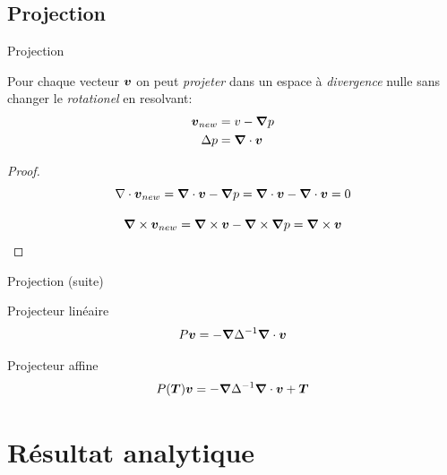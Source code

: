 \subsection{Projection}
\begin{frame}{Projection}
 
 \begin{property}
 Pour chaque vecteur ${\boldsymbol {v}}$ on peut \emph{projeter} dans un espace à \emph{divergence} nulle sans changer le \emph{rotationel} en resolvant:
  \begin{align*}
  {\boldsymbol {v}}_{new}&=v-{\boldsymbol {\nabla}} p\\
  \Delta p&={\boldsymbol {\nabla}} \cdot {\boldsymbol {v}}
  \end{align*}
  \begin{proof}
   \begin{equation*}
   \nabla\cdot {\boldsymbol {v}}_{new}={\boldsymbol {\nabla}} \cdot {\boldsymbol {v}}-{\boldsymbol {\nabla}} p={\boldsymbol {\nabla}} \cdot {\boldsymbol {v}}-{\boldsymbol {\nabla}} \cdot {\boldsymbol {v}}=0
   \end{equation*}
   
   \begin{equation*}
    {\boldsymbol {\nabla}} \times {\boldsymbol {v}}_{new}={\boldsymbol {\nabla}} \times {\boldsymbol {v}}-{\boldsymbol {\nabla}}\times {\boldsymbol {\nabla}}p={\boldsymbol {\nabla}} \times {\boldsymbol {v}}
   \end{equation*}
  \end{proof}

 \end{property}
 
\end{frame}

\begin{frame}{Projection (suite)}
  \begin{definition}{Projecteur linéaire}
  \begin{equation*}
   P{\boldsymbol {v}}=-{\boldsymbol {\nabla}}\Delta^{-1}{\boldsymbol {\nabla}}\cdot {\boldsymbol {v}}
  \end{equation*}
 \end{definition}
 
  \begin{definition}{Projecteur affine}
  \begin{equation*}
   P({\boldsymbol {T}}){\boldsymbol {v}}=-{\boldsymbol {\nabla}}\Delta^{-1}{\boldsymbol {\nabla}}\cdot {\boldsymbol {v}}+{\boldsymbol {T}}
  \end{equation*}
 \end{definition}
\end{frame}


\section{Résultat analytique}
